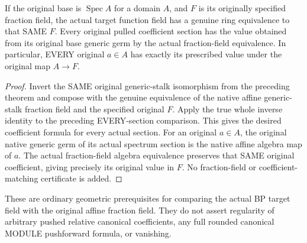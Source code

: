 \begin{theorem}
\label{sc0-generic-open-field:specified-original-fractions}
\leanok
If the original base is $\operatorname{Spec}A$ for a domain $A$, and
$F$ is its originally specified fraction field, the actual target
function field has a genuine ring equivalence to that SAME $F$.
Every original pulled coefficient section has the value obtained
from its original base generic germ by the actual fraction-field
equivalence. In particular, EVERY original $a\in A$ has exactly its
prescribed value under the original map $A\to F$.
\end{theorem}
\begin{proof}
Invert the SAME original generic-stalk isomorphism from the preceding
theorem and compose with the genuine equivalence of the native
affine generic-stalk fraction field and the specified original $F$.
Apply the true whole inverse identity to the preceding EVERY-section
comparison. This gives the desired coefficient formula for every
actual section. For an original $a\in A$, the original native generic
germ of its actual spectrum section is the native affine algebra map
of $a$. The actual fraction-field algebra equivalence preserves that
SAME original coefficient, giving precisely its original value in
$F$. No fraction-field or coefficient-matching certificate is added.
\end{proof}

These are ordinary geometric prerequisites for comparing the actual
BP target field with the original affine fraction field. They do not
assert regularity of arbitrary pushed relative canonical coefficients,
any full rounded canonical MODULE pushforward formula, or vanishing.

